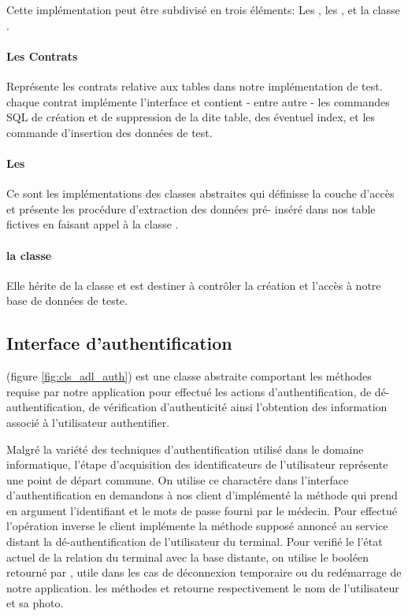 Cette implémentation peut être subdivisé en trois éléments: Les , les , et la classe .

\paragraph{Les Contrats}

Représente les contrats relative aux tables dans notre implémentation de
test. chaque contrat implémente l'interface
 et contient - entre autre - les
commandes SQL de création et de suppression de la dite table, des
éventuel index, et les commande d'insertion des données de test.

\paragraph{Les } 

Ce sont les implémentations des classes abstraites qui définisse la
couche d’accès et présente les procédure d'extraction des données pré-
inséré dans nos table fictives en faisant appel à la classe
 .

\paragraph[la classe \dev{DBSetup}]{la classe } 

Elle hérite de la classe  et est destiner à
contrôler la création et l’accès à notre base de données de teste.

\subsection{Interface d'authentification}

 (figure
\ref{fig:cls_adl_auth}) est une classe abstraite comportant les méthodes
requise par notre application pour effectué les actions
d'authentification, de dé-authentification, de vérification
d'authenticité ainsi l'obtention des information associé à l'utilisateur
authentifier.

Malgré la variété des techniques d'authentification utilisé dans le
domaine informatique, l'étape d'acquisition des identificateurs de
l'utilisateur représente une point de départ commune. On utilise ce
charactére dans l'interface d'authentification en demandons à nos client
d'implémenté la méthode  qui prend en argument
l'identifiant et le mots de passe fourni par le médecin. Pour effectué
l’opération inverse le client implémente la méthode 
supposé annoncé au service distant la dé-authentification de
l'utilisateur du terminal. Pour verifié le l'état actuel de la relation
du terminal avec la base distante, on utilise le booléen retourné par
, utile dans les cas de déconnexion temporaire ou du
redémarrage de notre application. les méthodes  et
 retourne respectivement le nom de l'utilisateur et sa
photo.

